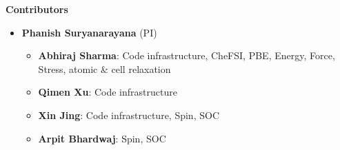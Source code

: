   \begin{frame}[allowframebreaks]{\textbf{Contributors}} \label{Contributors}

	\begin{itemize}
	\item \textbf{Phanish Suryanarayana} (PI)
	\begin{itemize}
 	    \item \textbf{Abhiraj Sharma}: Code infrastructure, CheFSI, PBE, Energy, Force, Stress, atomic \& cell relaxation \\   
 	    \item \textbf{Qimen Xu}: Code infrastructure \\  
        \item \textbf{Xin Jing}: Code infrastructure, Spin, SOC \\  
        \item \textbf{Arpit Bhardwaj}: Spin, SOC \\  
 	\end{itemize}
 	\end{itemize}
  
\end{frame}


